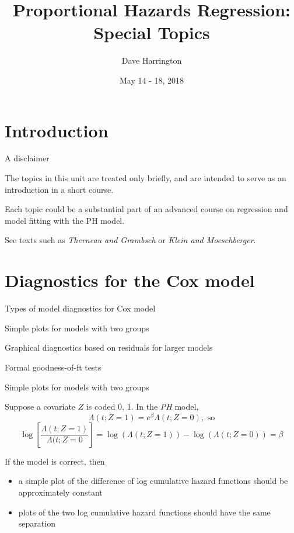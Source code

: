 \documentclass[ignorenonframetext,]{beamer}
\title{Proportional Hazards Regression: Special Topics}
\author{Dave Harrington}
\date{May 14 - 18, 2018}
\begin{document}
\frame{\titlepage}

\begin{frame}
\tableofcontents[hideallsubsections]
\end{frame}
\hypertarget{introduction}{%
\section{Introduction}\label{introduction}}

\begin{frame}{%
\protect\hypertarget{a-disclaimer}{%
A disclaimer}}

The topics in this unit are treated only briefly, and are intended to
serve as an introduction in a short course.

Each topic could be a substantial part of an advanced course on
regression and model fitting with the PH model.

See texts such as \emph{Therneau and Grambsch} or \emph{Klein and
Moeschberger}.

\end{frame}

\hypertarget{diagnostics-for-the-cox-model}{%
\section{Diagnostics for the Cox
model}\label{diagnostics-for-the-cox-model}}

\begin{frame}{%
\protect\hypertarget{types-of-model-diagnostics-for-cox-model}{%
Types of model diagnostics for Cox model}}

Simple plots for models with two groups

Graphical diagnostics based on residuals for larger models

Formal goodness-of-ft tests

\end{frame}

\begin{frame}{%
\protect\hypertarget{simple-plots-for-models-with-two-groups}{%
Simple plots for models with two groups}}

Suppose a covariate \(Z\) is coded 0, 1. In the \emph{PH} model, \[
\Lambda(t; Z = 1) = e^\beta \Lambda(t; Z = 0), \text{ so}
\]
\[ \log\left[\frac{\Lambda(t; Z = 1)}{\Lambda(t; Z = 0}\right] = \log(\Lambda(t; Z = 1)) - \log(\Lambda(t; Z = 0)) = \beta
\]

If the model is correct, then

\begin{itemize}
\item
  a simple plot of the difference of log cumulative hazard functions
  should be approximately constant
\item
  plots of the two log cumulative hazard functions should have the same
  separation
\end{itemize}

\end{frame}
\end{document}
